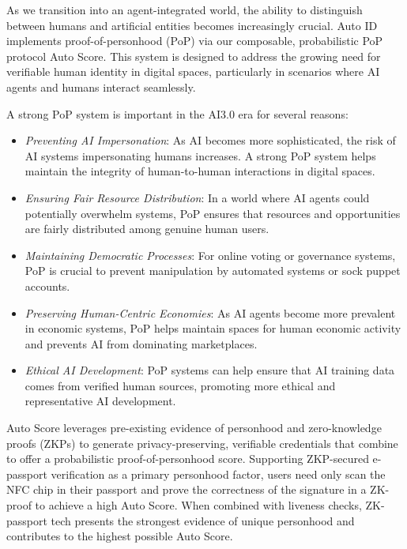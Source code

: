 \documentclass[conference]{IEEEtran}
\begin{document}
As we transition into an agent-integrated world, the ability to distinguish between humans and artificial entities becomes increasingly crucial. Auto ID implements proof-of-personhood (PoP) via our composable, probabilistic PoP protocol Auto Score. This system is designed to address the growing need for verifiable human identity in digital spaces, particularly in scenarios where AI agents and humans interact seamlessly.

A strong PoP system is important in the AI3.0 era for several reasons:

\begin{itemize}
    \item \textit{Preventing AI Impersonation}: As AI becomes more sophisticated, the risk of AI systems impersonating humans increases. A strong PoP system helps maintain the integrity of human-to-human interactions in digital spaces.
    \item \textit{Ensuring Fair Resource Distribution}: In a world where AI agents could potentially overwhelm systems, PoP ensures that resources and opportunities are fairly distributed among genuine human users.
    \item \textit{Maintaining Democratic Processes}: For online voting or governance systems, PoP is crucial to prevent manipulation by automated systems or sock puppet accounts.
    \item \textit{Preserving Human-Centric Economies}: As AI agents become more prevalent in economic systems, PoP helps maintain spaces for human economic activity and prevents AI from dominating marketplaces.
    \item \textit{Ethical AI Development}: PoP systems can help ensure that AI training data comes from verified human sources, promoting more ethical and representative AI development.
\end{itemize}

Auto Score leverages pre-existing evidence of personhood and zero-knowledge proofs (ZKPs) to generate privacy-preserving, verifiable credentials that combine to offer a probabilistic proof-of-personhood score. Supporting ZKP-secured e-passport verification as a primary personhood factor, users need only scan the NFC chip in their passport and prove the correctness of the signature in a ZK-proof to achieve a high Auto Score. When combined with liveness checks, ZK-passport tech presents the strongest evidence of unique personhood and contributes to the highest possible Auto Score.
\end{document}
